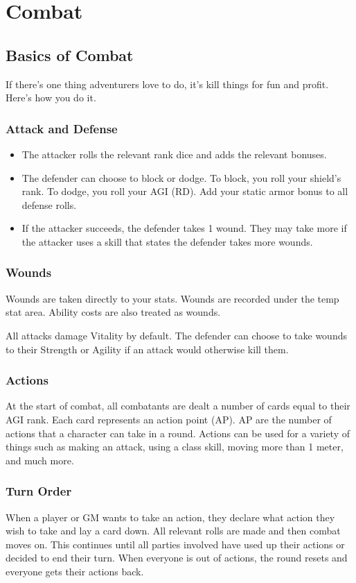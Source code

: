 \chapter{Combat}
\begin{multicols}{2}
\section{Basics of Combat}
If there's one thing adventurers love to do, it's kill things for fun and profit. Here's how you do it.
\subsection{Attack and Defense}
\begin{itemize}
\item The attacker rolls the relevant rank dice and adds the relevant bonuses.
\item The defender can choose to block or dodge. To block, you roll your shield's rank. To dodge, you roll your AGI (RD). Add your static armor bonus to all defense rolls.
\item If the attacker succeeds, the defender takes 1 wound. They may take more if the attacker uses a skill that states the defender takes more wounds.
\end{itemize}
\subsection{Wounds}
Wounds are taken directly to your stats. Wounds are recorded under the temp stat area. Ability costs are also treated as wounds.

All attacks damage Vitality by default. The defender can choose to take wounds to their Strength or Agility if an attack would otherwise kill them.


\subsection{Actions}
At the start of combat, all combatants are dealt a number of cards equal to their AGI rank. Each card represents an action point (AP). AP are the number of actions that a character can take in a round. Actions can be used for a variety of things such as making an attack, using a class skill, moving more than 1 meter, and much more.

\subsection{Turn Order}
When a player or GM wants to take an action, they declare what action they wish to take and lay a card down. All relevant rolls are made and then combat moves on. This continues until all parties involved have used up their actions or decided to end their turn. When everyone is out of actions, the round resets and everyone gets their actions back.


\end{multicols}
